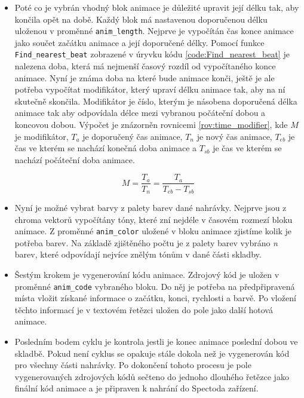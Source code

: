 \begin{itemize}
    \item Poté co je vybrán vhodný blok animace je důležité upravit její délku tak, aby končila opět na době. Každý blok má nastavenou doporučenou délku uloženou v proměnné \texttt{anim\_length}. Nejprve je vypočítán čas konce animace jako součet začátku animace a její doporučené délky. Pomocí funkce \texttt{Find\_nearest\_beat} zobrazené v úryvku kódu \ref{code:Find_nearest_beat} je nalezena doba, která má nejmenší časový rozdíl od vypočítaného konce animace. Nyní je známa doba na které bude animace konči, ještě je ale potřeba vypočítat modifikátor, který upraví délku animace tak, aby na ní skutečně skončila. Modifikátor je číslo, kterým je násobena doporučená délka animace tak aby odpovídala délce mezi vybranou počáteční dobou a koncovou dobou. Výpočet je znázorněn rovnicemi \ref{rov:time_modifier}, kde $M$ je modifikátor, $T_a$ je doporučený čas animace, $T_n$ je nový čas animace, $T_{eb}$ je čas ve kterém se nachází konečná doba animace a $T_{sb}$ je čas ve kterém se nachází počáteční doba animace.
    
    \begin{equation}
        M = \frac{T_a}{T_n} = \frac{T_a}{T_{eb} - T_{sb}}
        \label{rov:time_modifier}
    \end{equation}
    
    \item Nyní je možné vybrat barvy z palety barev dané nahrávky. Nejprve jsou z chroma vektorů vypočítány tóny, které zní nejdéle v časovém rozmezí bloku animace. Z proměnné \texttt{anim\_color} uložené v bloku animace zjistíme kolik je potřeba barev. Na základě zjištěného počtu je z palety barev vybráno \textit{n} barev, které odpovídají nejvíce znělým tónům v dané části skladby. 

    \item Šestým krokem je vygenerování kódu animace. Zdrojový kód je uložen v proměnné \texttt{anim\_code} vybraného bloku. Do něj je potřeba na předpřipravená místa vložit získané informace o začátku, konci, rychlosti a barvě. Po vložení těchto informací je v textovém řetězci uložen do pole jako další hotová animace. 
    
    \item Posledním bodem cyklu je kontrola jestli je konec animace poslední dobou ve skladbě. Pokud není cyklus se opakuje stále dokola než je vygenerován kód pro všechny části nahrávky. Po dokončení tohoto procesu je pole vygenerovaných zdrojových kódů sečteno do jednoho dlouhého řetězce jako finální kód animace a je připraven k nahrání do Spectoda zařízení. 
    
\end{itemize}

